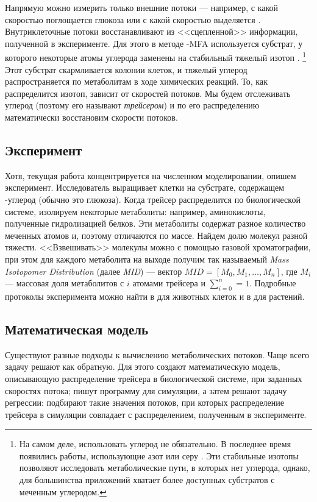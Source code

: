 \documentclass[a4paper, 12pt, left=30mm, right=15mm, top=20mm, bottom=20mm]{report}
\begin{document}
Напрямую можно измерить только внешние потоки --- например, с какой скоростью поглощается глюкоза или с какой скоростью выделяется . Внутриклеточные потоки восстанавливают из <<сцепленной>> информации, полученной в эксперименте. Для этого в методе -MFA используется субстрат, у которого некоторые атомы углерода заменены на стабильный тяжелый изотоп .
\footnote{На самом деле, использовать углерод не обязательно. В последнее время появились работы, использующие  азот \cite{nitrogen_mfa} или  серу \cite{sulfur_mfa}. Эти стабильные изотопы позволяют исследовать метаболические пути, в которых нет углерода, однако, для большинства приложений хватает более доступных субстратов с меченным углеродом.} 
Этот субстрат скармливается колонии клеток, и тяжелый углерод распространяется по метаболитам в ходе химических реакций. То, как распределится изотоп, зависит от скоростей потоков. Мы будем отслеживать углерод (поэтому его называют \emph{трейсером}) и по его распределению математически восстановим скорости потоков.

\subsection{Эксперимент}
Хотя, текущая работа концентрируется на численном моделировании, опишем эксперимент\cite[стр. 312]{protocol}. Исследователь выращивает клетки на субстрате, содержащем -углерод (обычно это глюкоза). Когда трейсер распределится по биологической системе, изолируем некоторые метаболиты: например, аминокислоты, полученные гидролизацией белков. Эти метаболиты содержат разное количество меченных атомов и, поэтому отличаются по массе. Найдем долю молекул разной тяжести. <<Взвешивать>> молекулы можно с помощью газовой хроматографии, при этом для каждого метаболита на выходе получим так называемый \emph{Mass Isotopomer Distribution} (далее \emph{MID}) --- вектор $MID = [M_0, M_1, \ldots, M_n]$, где $M_i$ --- массовая доля метаболитов с $i$ атомами трейсера и $\sum_{i = 0}^{n} = 1$. Подробные протоколы эксперимента можно найти в \cite{protocol_animal} для животных клеток и в \cite{protocol_plant} для растений.

\subsection{Математическая модель}
Существуют разные подходы к вычислению метаболических потоков. Чаще всего задачу решают как обратную. Для этого создают математическую модель, описывающую распределение трейсера в биологической системе, при заданных скоростях потока; пишут программу для симуляции, а затем решают задачу регрессии: подбирают такие значения потоков, при которых распределение трейсера в симуляции совпадает с распределением, полученным в эксперименте.
\end{document}
